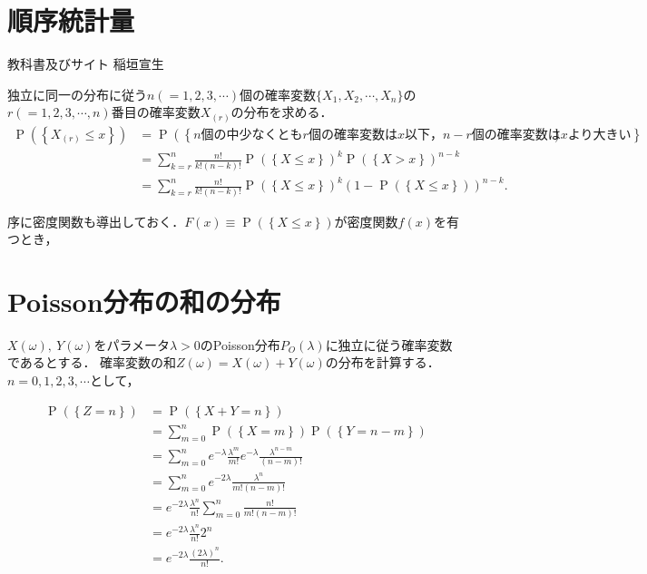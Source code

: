 \documentclass[a4j,papersize,disablejfam,slide,14pt]{jsarticle}
\def\exp#1{e^{#1}} %
\def\prob#1{\operatorname{P} \left(\left\{ #1 \right\}\right)} %
\begin{document}
\section{順序統計量}
\label{sec:appendix_order_statistic}
	\begin{itembox}[l]{教科書及びサイト}
    	{\rm 稲垣宣生}
    \end{itembox}
	独立に同一の分布に従う$n(=1,2,3,\cdots)$個の確率変数$ \{ X_1,X_2,\cdots,X_n \} $の$r(=1,2,3,\cdots,n)$番目の確率変数$ X_{(r)} $の分布を求める．
    \begin{align}
    	\prob{X_{(r)} \leq x} &= \prob{\mbox{$n$個の中少なくとも$r$個の確率変数は$x$以下，$n-r$個の確率変数は$x$より大きい}} \\
        &= \sum_{k=r}^{n} \frac{n!}{k!(n-k)!} \prob{X \leq x}^k \prob{X > x}^{n-k} \\
        &= \sum_{k=r}^{n} \frac{n!}{k!(n-k)!} \prob{X \leq x}^k \left( 1 - \prob{X \leq x} \right)^{n-k}.
    \end{align}
    
    序に密度関数も導出しておく．$F(x) \equiv \prob{X \leq x}$が密度関数$f(x)$を有つとき，
    


\section{{\rm Poisson}分布の和の分布}
\label{sec:appendix_poisson}
	$X(\omega),\ Y(\omega)$をパラメータ$\lambda > 0$の{\rm Poisson}分布$P_O(\lambda)$に独立に従う確率変数であるとする．
    確率変数の和$Z(\omega) = X(\omega) + Y(\omega)$の分布を計算する．$n = 0,1,2,3,\cdots$として，
    
    \begin{align}
    	\prob{Z = n} &= \prob{X + Y = n} \\
        &= \sum_{m=0}^{n} \prob{X=m} \prob{Y=n-m} \\
        &= \sum_{m=0}^{n} \exp{-\lambda} \frac{\lambda^m}{m!} \exp{-\lambda} \frac{\lambda^{n-m}}{(n-m)!} \\
        &= \sum_{m=0}^{n} \exp{-2\lambda} \frac{\lambda^n}{m!(n-m)!} \\
        &= \exp{-2\lambda} \frac{\lambda^n}{n!} \sum_{m=0}^{n} \frac{n!}{m!(n-m)!} \\
        &= \exp{-2\lambda} \frac{\lambda^n}{n!} 2^n \\
        &= \exp{-2\lambda} \frac{(2\lambda)^n}{n!}.
    \end{align}
    
\end{document}
